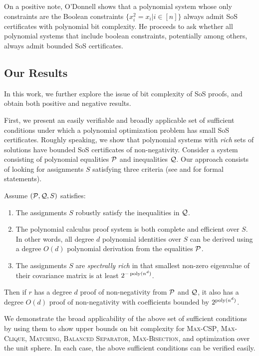 On a positive note, O'Donnell shows that a polynomial system whose only constraints are the Boolean constraints $\{x_i^2 = x_i | i \in [n]\}$ always admit SoS certificates with polynomial bit complexity.  
%
He proceeds to ask whether all polynomial systems that include boolean constraints, potentially among others, always admit bounded SoS certificates.


\subsection{Our Results}

In this work, we further explore the issue of bit complexity of SoS proofs, and obtain both positive and negative results.
%

First, we present an easily verifiable and broadly applicable set of sufficient conditions under which a polynomial optimization problem has small SoS certificates.
%
Roughly speaking, we show that polynomial systems with {\it rich} sets of solutions have bounded SoS certificates of non-negativity.
%
Consider a system consisting of polynomial equalities $\mathcal P$ and inequalities $\mathcal Q$.  Our approach consists of looking for assignments $S$ satisfying three criteria (see  and  for formal statements).  
\begin{theorem}
Assume $(\mathcal P, \mathcal Q, S)$ satisfies:
\begin{enumerate}
\item The assignments $S$ robustly satisfy the inequalities in $\mathcal Q$.  
\item The polynomial calculus proof system is both complete and efficient over $S$.  In other words, all degree $d$ polynomial identities over $S$ can be derived using a degree $O(d)$ polynomial derivation from the equalities $\mathcal P$.
\item The assignments $S$ are {\it spectrally rich} in that smallest non-zero eigenvalue of their covariance matrix is at least $2^{-\operatorname{poly}(n^d)}$. 
\end{enumerate}
Then if $r$ has a degree $d$ proof of non-negativity from $\mathcal P$ and $\mathcal Q$, it also has a degree $O(d)$ proof of non-negativity with coefficients bounded by $2^{\operatorname{poly}(n^d)}$.
\end{theorem}

We demonstrate the broad applicability of the above set of sufficient conditions by using them to show upper bounds on bit complexity for \textsc{Max-CSP}, \textsc{Max-Clique}, \textsc{Matching}, \textsc{Balanced Separator}, \textsc{Max-Bisection}, and optimization over the unit sphere.  In each case, the above sufficient conditions can be verified easily. 
%

